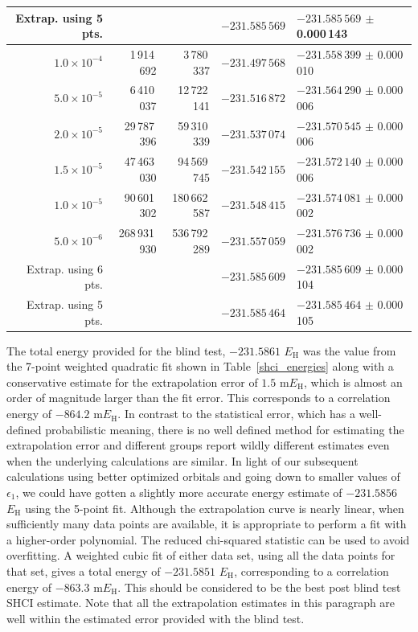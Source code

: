 \documentclass[journal=jcp,manuscript=suppinfo]{achemso}
\begin{document}
\begin{table}[ht!]
\begin{center}
\begin{tabular}{rrrll}
Extrap. using 5 pts. &&&                               $-231.585\,569$   & $-231.585\,569$ $\pm$ 0.000\,143 \\
\midrule
$1.0 \times 10^{-4}$ &   1\,914\,692 &   3\,780\,337 & $-231.497\,568$   & $-231.558\,399$ $\pm$ 0.000\,010 \\
$5.0 \times 10^{-5}$ &   6\,410\,037 &  12\,722\,141 & $-231.516\,872$   & $-231.564\,290$ $\pm$ 0.000\,006 \\
$2.0 \times 10^{-5}$ &  29\,787\,396 &  59\,310\,339 & $-231.537\,074$   & $-231.570\,545$ $\pm$ 0.000\,006 \\
$1.5 \times 10^{-5}$ &  47\,463\,030 &  94\,569\,745 & $-231.542\,155$   & $-231.572\,140$ $\pm$ 0.000\,006 \\
$1.0 \times 10^{-5}$ &  90\,601\,302 & 180\,662\,587 & $-231.548\,415$   & $-231.574\,081$ $\pm$ 0.000\,002 \\
$5.0 \times 10^{-6}$ & 268\,931\,930 & 536\,792\,289 & $-231.557\,059$   & $-231.576\,736$ $\pm$ 0.000\,002 \\
Extrap. using 6 pts. &&&                               $-231.585\,609$   & $-231.585\,609$ $\pm$ 0.000\,104 \\
Extrap. using 5 pts. &&&                               $-231.585\,464$   & $-231.585\,464$ $\pm$ 0.000\,105 \\
\midrule
\end{tabular}
\end{center}
\end{table}
%
The total energy provided for the blind test, $-231.5861$ $E_{\text{H}}$ was the value from the 7-point weighted quadratic fit shown in Table~\ref{shci_energies} along with a conservative estimate for the extrapolation error of $1.5$ m$E_{\text{H}}$, which is almost an order of magnitude larger than the fit error. This corresponds to a correlation energy of $-864.2$ m$E_{\text{H}}$. In contrast to the statistical error, which has a well-defined probabilistic meaning, there is no well defined method for estimating the extrapolation error and different groups report wildly different estimates even when the underlying calculations are similar. In light of our subsequent calculations using better optimized orbitals and going down to smaller values of $\epsilon_1$, we could have gotten a slightly more accurate energy estimate of $-231.5856$ $E_{\text{H}}$ using the 5-point fit. Although the extrapolation curve is nearly linear, when sufficiently many data points are available, it is appropriate to perform a fit with a higher-order polynomial. The reduced chi-squared statistic can be used to avoid overfitting. A weighted cubic fit of either data set, using all the data points for that set, gives a total energy of $-231.5851$ $E_{\text{H}}$, corresponding to a correlation energy of
$-863.3$ m$E_{\text{H}}$. This should be considered to be the best post blind test SHCI estimate. Note that all the extrapolation estimates in this paragraph are well within the estimated error provided with the blind test.\\
\end{document}
